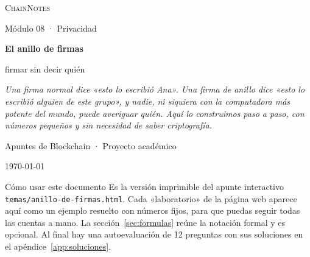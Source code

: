 \documentclass[11pt,a4paper]{article}
\theoremstyle{definition}
\theoremstyle{plain}
\theoremstyle{remark}
\begin{document}

\makeatletter
\DeclareRobustCommand{\%}{\char`\%\relax}
\makeatother

\begin{titlepage}
\centering
\vspace*{2.5cm}

{\Large\color{violetdeep}\textsc{ChainNotes}\par}
{\small\color{inkc}Módulo 08 · Privacidad\par}

\vspace{1.4cm}
{\Huge\bfseries El anillo de firmas\par}
\vspace{0.4cm}
{\LARGE firmar sin decir quién\par}

\vspace{1.2cm}
\begin{minipage}{0.78\textwidth}
\centering\itshape\color{inkc}
Una firma normal dice «esto lo escribió Ana». Una firma de anillo dice «esto lo
escribió alguien de este grupo», y nadie, ni siquiera con la computadora más
potente del mundo, puede averiguar quién. Aquí lo construimos paso a paso, con
números pequeños y sin necesidad de saber criptografía.
\end{minipage}

\vspace{1.6cm}

\vfill
{\small Apuntes de Blockchain · Proyecto académico\par}
{\small\color{inkc}\today\par}
\end{titlepage}

\tableofcontents
\clearpage

\begin{nota}{Cómo usar este documento}
Es la versión imprimible del apunte interactivo \texttt{temas/anillo-de-firmas.html}.
Cada «laboratorio» de la página web aparece aquí como un ejemplo resuelto con
números fijos, para que puedas seguir todas las cuentas a mano. La sección~\ref{sec:formulas}
reúne la notación formal y es opcional. Al final hay una autoevaluación de 12
preguntas con sus soluciones en el apéndice~\ref{app:soluciones}.
\end{nota}
\end{document}
